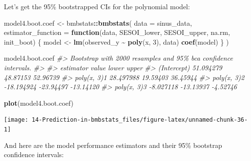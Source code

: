 \documentclass[
]{book}
\newenvironment{Shaded}{\begin{snugshade}}{\end{snugshade}}
\newcommand{\CommentTok}[1]{\textcolor[rgb]{0.56,0.35,0.01}{\textit{#1}}}
\newcommand{\ControlFlowTok}[1]{\textcolor[rgb]{0.13,0.29,0.53}{\textbf{#1}}}
\newcommand{\DataTypeTok}[1]{\textcolor[rgb]{0.13,0.29,0.53}{#1}}
\newcommand{\DecValTok}[1]{\textcolor[rgb]{0.00,0.00,0.81}{#1}}
\newcommand{\KeywordTok}[1]{\textcolor[rgb]{0.13,0.29,0.53}{\textbf{#1}}}
\newcommand{\NormalTok}[1]{#1}
\newcommand{\OperatorTok}[1]{\textcolor[rgb]{0.81,0.36,0.00}{\textbf{#1}}}
\newcommand{\StringTok}[1]{\textcolor[rgb]{0.31,0.60,0.02}{#1}}
\begin{document}
Let's get the 95\% bootstrapped CIs for the polynomial model:

\begin{Shaded}
\begin{Highlighting}[]
\NormalTok{model4.boot.coef <{-}}\StringTok{ }\NormalTok{bmbstats}\OperatorTok{::}\KeywordTok{bmbstats}\NormalTok{(}
  \DataTypeTok{data =}\NormalTok{ sinus\_data, }
  \DataTypeTok{estimator\_function =} \ControlFlowTok{function}\NormalTok{(data, SESOI\_lower, SESOI\_upper, na.rm, init\_boot) \{}
\NormalTok{    model <{-}}\StringTok{ }\KeywordTok{lm}\NormalTok{(observed\_y }\OperatorTok{\textasciitilde{}}\StringTok{ }\KeywordTok{poly}\NormalTok{(x, }\DecValTok{3}\NormalTok{), data)}
    \KeywordTok{coef}\NormalTok{(model)}
\NormalTok{  \}}
\NormalTok{)}

\NormalTok{model4.boot.coef}
\CommentTok{\#> Bootstrap with 2000 resamples and 95\% bca confidence intervals.}
\CommentTok{\#> }
\CommentTok{\#>    estimator      value     lower     upper}
\CommentTok{\#>  (Intercept)  51.094279  48.87153  52.96739}
\CommentTok{\#>  poly(x, 3)1  28.497988  19.59403  36.45944}
\CommentTok{\#>  poly(x, 3)2 {-}18.194924 {-}23.94497 {-}13.14120}
\CommentTok{\#>  poly(x, 3)3  {-}8.027118 {-}13.13937  {-}4.52746}
\end{Highlighting}
\end{Shaded}

\begin{Shaded}
\begin{Highlighting}[]
\KeywordTok{plot}\NormalTok{(model4.boot.coef)}
\end{Highlighting}
\end{Shaded}

\begin{center}\texttt{[image: 14-Prediction-in-bmbstats\_files/figure-latex/unnamed-chunk-36-1]} \end{center}

And here are the model performance estimators and their 95\% bootstrap confidence intervals:
\end{document}
